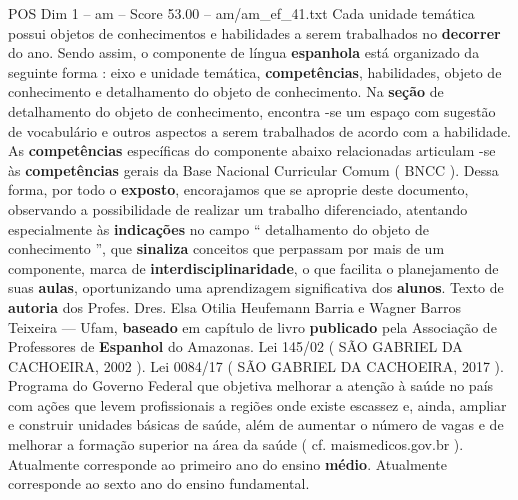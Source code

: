 \begin{textsample}{POS Dim 1 – am – Score 53.00 – am/am\_ef\_41.txt}
Cada unidade temática possui objetos de conhecimentos e habilidades a serem trabalhados no \textbf{decorrer} do ano.
Sendo assim, o componente de língua \textbf{espanhola} está organizado da seguinte forma : eixo e unidade temática, \textbf{competências}, habilidades, objeto de conhecimento e detalhamento do objeto de conhecimento.
Na \textbf{seção} de detalhamento do objeto de conhecimento, encontra -se um espaço com sugestão de vocabulário e outros aspectos a serem trabalhados de acordo com a habilidade.
As \textbf{competências} específicas do componente abaixo relacionadas articulam -se às \textbf{competências} gerais da Base Nacional Curricular Comum ( BNCC ).
Dessa forma, por todo o \textbf{exposto}, encorajamos que se aproprie deste documento, observando a possibilidade de realizar um trabalho diferenciado, atentando especialmente às \textbf{indicações} no campo “ detalhamento do objeto de conhecimento ”, que \textbf{sinaliza} conceitos que perpassam por mais de um componente, marca de \textbf{interdisciplinaridade}, o que facilita o planejamento de suas \textbf{aulas}, oportunizando uma aprendizagem significativa dos \textbf{alunos}.
Texto de \textbf{autoria} dos Profes.
Dres.
Elsa Otilia Heufemann Barria e Wagner Barros Teixeira — Ufam, \textbf{baseado} em capítulo de livro \textbf{publicado} pela Associação de Professores de \textbf{Espanhol} do Amazonas.
Lei 145/02 ( SÃO GABRIEL DA CACHOEIRA, 2002 ).
Lei 0084/17 ( SÃO GABRIEL DA CACHOEIRA, 2017 ).
Programa do Governo Federal que objetiva melhorar a atenção à saúde no país com ações que levem profissionais a regiões onde existe escassez e, ainda, ampliar e construir unidades básicas de saúde, além de aumentar o número de vagas e de melhorar a formação superior na área da saúde ( cf. maismedicos.gov.br ).
Atualmente corresponde ao primeiro ano do ensino \textbf{médio}.
Atualmente corresponde ao sexto ano do ensino fundamental.

\end{textsample}
